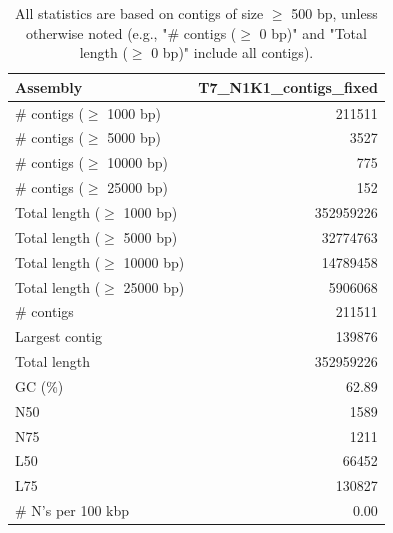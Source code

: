 \documentclass[12pt,a4paper]{article}
\begin{document}
\begin{table}[ht]
\begin{center}
\caption{All statistics are based on contigs of size $\geq$ 500 bp, unless otherwise noted (e.g., "\# contigs ($\geq$ 0 bp)" and "Total length ($\geq$ 0 bp)" include all contigs).}
\begin{tabular}{|l*{1}{|r}|}
\hline
Assembly & T7\_N1K1\_contigs\_fixed \\ \hline
\# contigs ($\geq$ 1000 bp) & 211511 \\ \hline
\# contigs ($\geq$ 5000 bp) & 3527 \\ \hline
\# contigs ($\geq$ 10000 bp) & 775 \\ \hline
\# contigs ($\geq$ 25000 bp) & 152 \\ \hline
Total length ($\geq$ 1000 bp) & 352959226 \\ \hline
Total length ($\geq$ 5000 bp) & 32774763 \\ \hline
Total length ($\geq$ 10000 bp) & 14789458 \\ \hline
Total length ($\geq$ 25000 bp) & 5906068 \\ \hline
\# contigs & 211511 \\ \hline
Largest contig & 139876 \\ \hline
Total length & 352959226 \\ \hline
GC (\%) & 62.89 \\ \hline
N50 & 1589 \\ \hline
N75 & 1211 \\ \hline
L50 & 66452 \\ \hline
L75 & 130827 \\ \hline
\# N's per 100 kbp & 0.00 \\ \hline
\end{tabular}
\end{center}
\end{table}
\end{document}
